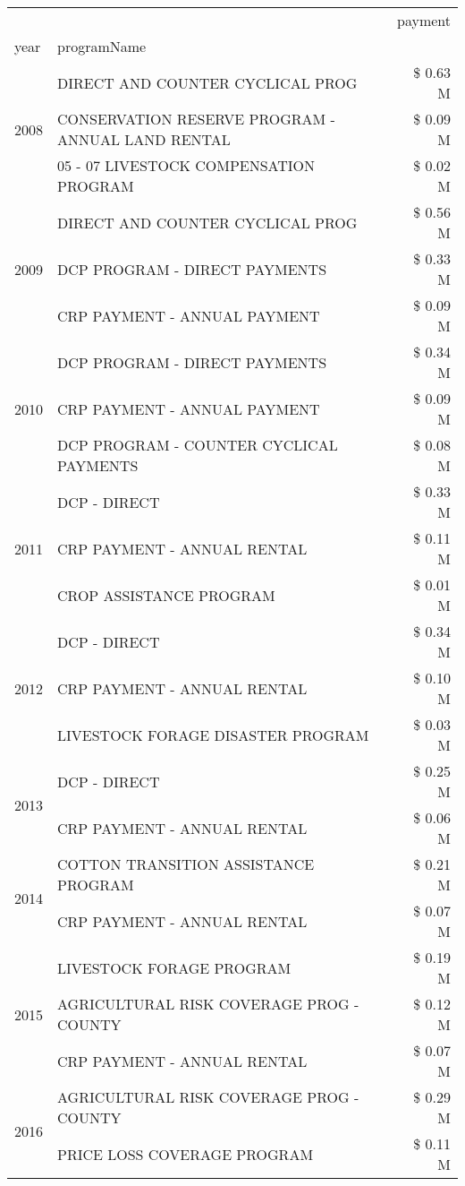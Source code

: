 \begin{tabular}{llr}
\toprule
 &  & payment \\
year & programName &  \\
\midrule
\multirow[t]{3}{*}{2008} & DIRECT AND COUNTER CYCLICAL PROG & \$ 0.63 M \\
 & CONSERVATION RESERVE PROGRAM - ANNUAL LAND RENTAL & \$ 0.09 M \\
 & 05 - 07 LIVESTOCK COMPENSATION PROGRAM & \$ 0.02 M \\
\cline{1-3}
\multirow[t]{3}{*}{2009} & DIRECT AND COUNTER CYCLICAL PROG & \$ 0.56 M \\
 & DCP PROGRAM - DIRECT PAYMENTS & \$ 0.33 M \\
 & CRP PAYMENT - ANNUAL PAYMENT & \$ 0.09 M \\
\cline{1-3}
\multirow[t]{3}{*}{2010} & DCP PROGRAM - DIRECT PAYMENTS & \$ 0.34 M \\
 & CRP PAYMENT - ANNUAL PAYMENT & \$ 0.09 M \\
 & DCP PROGRAM - COUNTER CYCLICAL PAYMENTS & \$ 0.08 M \\
\cline{1-3}
\multirow[t]{3}{*}{2011} & DCP - DIRECT & \$ 0.33 M \\
 & CRP PAYMENT - ANNUAL RENTAL & \$ 0.11 M \\
 & CROP ASSISTANCE PROGRAM & \$ 0.01 M \\
\cline{1-3}
\multirow[t]{3}{*}{2012} & DCP - DIRECT & \$ 0.34 M \\
 & CRP PAYMENT - ANNUAL RENTAL & \$ 0.10 M \\
 & LIVESTOCK FORAGE DISASTER PROGRAM & \$ 0.03 M \\
\cline{1-3}
\multirow[t]{2}{*}{2013} & DCP - DIRECT & \$ 0.25 M \\
 & CRP PAYMENT - ANNUAL RENTAL & \$ 0.06 M \\
\cline{1-3}
\multirow[t]{2}{*}{2014} & COTTON TRANSITION ASSISTANCE PROGRAM & \$ 0.21 M \\
 & CRP PAYMENT - ANNUAL RENTAL & \$ 0.07 M \\
\cline{1-3}
\multirow[t]{3}{*}{2015} & LIVESTOCK FORAGE PROGRAM & \$ 0.19 M \\
 & AGRICULTURAL RISK COVERAGE PROG - COUNTY & \$ 0.12 M \\
 & CRP PAYMENT - ANNUAL RENTAL & \$ 0.07 M \\
\cline{1-3}
\multirow[t]{3}{*}{2016} & AGRICULTURAL RISK COVERAGE PROG - COUNTY & \$ 0.29 M \\
 & PRICE LOSS COVERAGE PROGRAM & \$ 0.11 M \\

\end{tabular}
